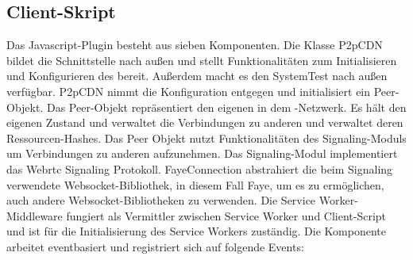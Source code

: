 \subsection{Client-Skript}

Das Javascript-Plugin besteht aus sieben Komponenten. Die Klasse P2pCDN bildet die Schnittstelle nach außen und stellt Funktionalitäten zum Initialisieren und Konfigurieren des \cdn bereit. Außerdem macht es den SystemTest nach außen verfügbar. P2pCDN nimmt die Konfiguration entgegen und initialisiert ein Peer-Objekt. Das Peer-Objekt repräsentiert den eigenen \client in dem \pTp-Netzwerk. Es hält den eigenen Zustand und verwaltet die Verbindungen zu anderen \clients und verwaltet deren Ressourcen-Hashes. Das Peer Objekt nutzt Funktionalitäten des Signaling-Moduls um Verbindungen zu anderen \clients aufzunehmen. Das Signaling-Modul implementiert das Webrtc Signaling Protokoll. FayeConnection abstrahiert die beim Signaling verwendete Websocket-Bibliothek, in diesem Fall Faye, um es zu ermöglichen, auch andere Websocket-Bibliotheken zu verwenden.
Die Service Worker-Middleware fungiert als Vermittler zwischen Service Worker und Client-Script und ist für die Initialisierung des Service Workers zuständig. Die Komponente arbeitet eventbasiert und registriert sich auf folgende Events:
